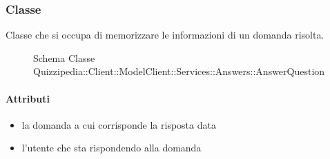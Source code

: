 \subsubsection{Classe }
Classe che si occupa di memorizzare le informazioni di un domanda risolta.
\begin{figure}[H]
\centering
\noindent{}
\caption[Schema Classe AnswerQuestion]{Schema Classe Quizzipedia::Client::ModelClient::Services::Answers::AnswerQuestion}
\end{figure}
\paragraph{Attributi}
\begin{itemize}
\item {}
\newline
la domanda a cui corrisponde la risposta data
\item {}
\newline
l'utente che sta rispondendo alla domanda
\end{itemize}
